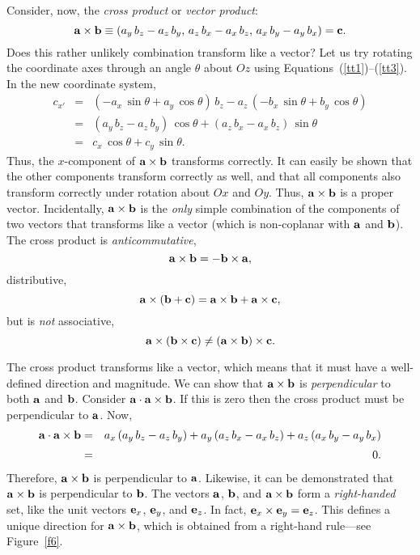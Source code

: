 Consider, now, the {\em cross product}\/ or {\em vector product}:
\begin{equation}
{\bf a}\times{\bf b} \equiv (a_y \, b_z-a_z\, b_y,\, a_z\, b_x - a_x\, b_z,\, a_x\, b_y - a_y\, b_x)
={\bf c}.
\end{equation}
Does this rather unlikely combination transform like a vector? Let us try
rotating the coordinate axes through an angle $\theta$  about $Oz$ using Equations~(\ref{tt1})--(\ref{tt3}).
In the new coordinate system,
\begin{eqnarray}
c_{x'} &= &(-a_x\, \sin\theta + a_y\,\cos\theta)\,b_z - a_z\,(-b_x\, \sin\theta + b_y\,\cos\theta)
\nonumber\\[0.5ex]
&=& (a_y\, b_z - a_z\, b_y)\, \cos\theta + (a_z\, b_x-a_x\, b_z)\,\sin\theta\nonumber\\[0.5ex]
& =& c_x\,\cos\theta
+c_y\,\sin\theta.
\end{eqnarray}
Thus, the $x$-component of ${\bf a}\times{\bf b}$ transforms correctly. It can
easily  be shown that the other components transform correctly as well, and that
all components also transform correctly under rotation about $Ox$ and $Oy$. 
Thus, ${\bf a}\times {\bf b}$ is a proper vector. Incidentally, ${\bf a}\times {\bf b}$
is the {\em only}\/ simple combination of the components of two vectors that transforms
like a vector (which is non-coplanar with ${\bf a}$ and ${\bf b}$).
 The cross product is 
{\em anticommutative},
\begin{equation}
{\bf a}\times{\bf b} = - {\bf b} \times{\bf a},
\end{equation}
distributive,
\begin{equation}
{\bf a}\times({\bf b} +{\bf c})=  {\bf a} \times{\bf b}+{\bf a}\times{\bf c},
\end{equation}
but is {\em not}\/ associative,
\begin{equation}
{\bf a}\times({\bf b} \times{\bf c})\neq ({\bf a}\times{\bf b}) \times{\bf c}.
\end{equation}

The cross product  transforms like a vector, which
means that it must have  a well-defined direction and magnitude. We can show
that ${\bf a}\times{\bf b}$ is {\em perpendicular}\/ to both ${\bf a}$ and ${\bf b}$.
Consider ${\bf a}\cdot {\bf a}\times{\bf b}$. If this is zero then the cross product
must be perpendicular to ${\bf a}$. Now,
\begin{eqnarray}
{\bf a}\cdot {\bf a}\times{\bf b} &= &a_x\,(a_y\, b_z-a_z\, b_y) + a_y\, (a_z\, b_x- a_x \,b_z)
+a_z\,(a_x \,b_y - a_y\, b_x)\nonumber\\[0.5ex]
&=& 0.
\end{eqnarray}
Therefore, ${\bf a}\times {\bf b}$ is perpendicular to ${\bf a}$. Likewise, it can
be demonstrated that ${\bf a}\times{\bf b}$ is perpendicular to ${\bf b}$. 
The vectors $\bf a$, $\bf b$, and ${\bf a}\times{\bf b}$ form a {\em right-handed}\/
set, like the unit vectors ${\bf e}_x$, ${\bf e}_y$, and ${\bf e}_z$. In fact,  ${\bf e}_x\times
{\bf e}_y={\bf e}_z$. This defines a unique direction for ${\bf a}\times{\bf b}$, which
is obtained from a right-hand rule---see Figure~\ref{f6}.

